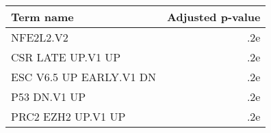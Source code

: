 \begin{tabular}{lr}
\toprule
              Term name &  Adjusted p-value \\
\midrule
              NFE2L2.V2 &               .2e \\
      CSR LATE UP.V1 UP &               .2e \\
ESC V6.5 UP EARLY.V1 DN &               .2e \\
           P53 DN.V1 UP &               .2e \\
     PRC2 EZH2 UP.V1 UP &               .2e \\
\bottomrule
\end{tabular}
